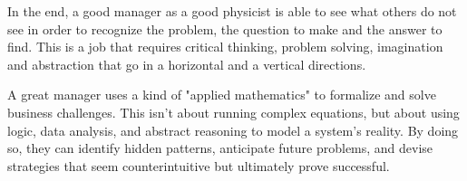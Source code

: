 \documentclass{article}
\begin{document}
In the end, a good manager as a good physicist is able to see what others do not see in order to recognize the problem, the question to make and the answer to find. This is a job that requires critical thinking, problem solving, imagination and abstraction that go in a horizontal and a vertical directions.

A great manager uses a kind of "applied mathematics" to formalize and solve business challenges. This isn't about running complex equations, but about using logic, data analysis, and abstract reasoning to model a system's reality. By doing so, they can identify hidden patterns, anticipate future problems, and devise strategies that seem counterintuitive but ultimately prove successful. 
\end{document}
